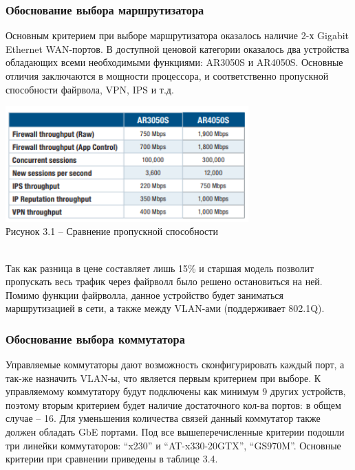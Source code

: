 \subsubsection{Обоснование выбора маршрутизатора}\label{subsubsec:func:RouterChoice}
    Основным критерием при выборе маршрутизатора оказалось наличие 2-х Gigabit Ethernet WAN-портов.
    В доступной ценовой категории оказалось два устройства обладающих всеми необходимыми функциями: AR3050S и AR4050S.
    Основные отличия заключаются в мощности процессора, и соответственно пропускной способности файрвола, VPN, IPS и т.д.
    \begin{center}
        \includegraphics[width=0.7\textwidth]{images/roters}\\
        Рисунок 3.1 – Сравнение пропускной способности
    \end{center}
    \\
    Так как разница в цене составляет лишь 15\% и старшая модель позволит пропускать весь трафик через файрволл было решено остановиться на ней.
    Помимо функции файрволла, данное устройство будет заниматься маршрутизацией в сети, а также между VLAN-ами (поддерживает 802.1Q).

\subsubsection{Обоснование выбора коммутатора}\label{subsubsec:func:SwitchChoice}

    Управляемые коммутаторы дают возможность сконфигурировать каждый порт, а так-же назначить VLAN-ы, что является первым критерием при выборе.
    К управляемому коммутатору будут подключены как минимум 9 других устройств, поэтому вторым критерием будет наличие достаточного кол-ва портов: в общем случае – 16.
    Для уменьшения количества связей данный коммутатор также должен обладать GbE портами.
    Под все вышеперечисленные критерии подошли три линейки коммутаторов: “x230” и “AT-x330-20GTX”, “GS970M”.
    Основные критерии при сравнении приведены в таблице 3.4.


